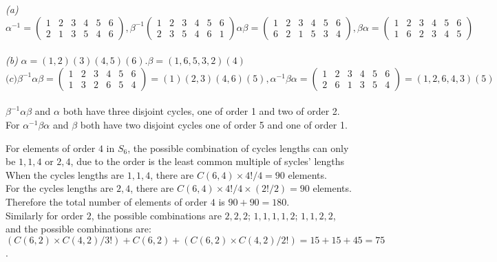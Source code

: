 \documentclass[11pt]{article}
\newenvironment{problem}[2][Problem]{\begin{trivlist}
\item[\hskip \labelsep {\bfseries #1}\hskip \labelsep {\bfseries #2.}]}{\end{trivlist}}
\begin{document}
\begin{problem}{(2)}
\textit{(a)} \[ \alpha^{-1} =  \begin{pmatrix} 1&2&3&4&5&6 \\ 2&1&3&5&4&6  \end{pmatrix} , \beta^{-1} \begin{pmatrix} 1&2&3&4&5&6 \\ 2&3&5&4&6&1  \end{pmatrix}
\alpha \beta = \begin{pmatrix} 1&2&3&4&5&6 \\ 6&2&1&5&3&4\end{pmatrix}, \beta \alpha = \begin{pmatrix} 1&2&3&4&5&6 \\ 1&6&2&3&4&5 \end{pmatrix}\]\\
\textit{(b)} $\alpha = (1,2)(3)(4,5)(6). \beta = (1,6,5,3,2)(4)$\\
\[ \textit{(c)} \beta^{-1} \alpha \beta = \begin{pmatrix} 1&2&3&4&5&6\\ 1&3&2&6&5&4 \end{pmatrix} = (1)(2,3)(4,6)(5), \alpha^{-1}\beta \alpha = 
\begin{pmatrix} 1&2&3&4&5&6 \\ 2&6&1&3&5&4 \end{pmatrix} = (1,2,6,4,3)(5) \]\\
$\beta^{-1}\alpha\beta$ and $\alpha$ both have three disjoint cycles, one of order 1 and two of order 2. For $\alpha^{-1}\beta\alpha$ and $\beta$ both have two disjoint cycles
one of order 5 and one of order 1.\\
\end{problem}
\newpage
\begin{problem}{(3)}
For elements of order $4$ in $S_6$, the possible combination of cycles lengths can only be $1,1,4$ or $2,4$, due to the order is the least common multiple
of sycles' lengths\\
When the cycles lengths are $1,1,4$, there are $C(6,4) \times 4! / 4= 90$ elements. \\
For the cycles lengths are $2,4$, there are $C(6,4) \times 4! /4 \times (2!/2)= 90$ elements.\\
Therefore the total number of elements of order $4$ is $90+90 = 180$.\\
Similarly for order $2$, the possible combinations are $2,2,2$; $1,1,1,1,2$; $1,1,2,2$, and the possible combinations are:\\
$(C(6,2) \times C(4,2)/3!) + C(6,2) +(C(6,2) \times C(4,2)/2!) = 15+15+45 = 75 $.\\
\end{problem}
\end{document}
